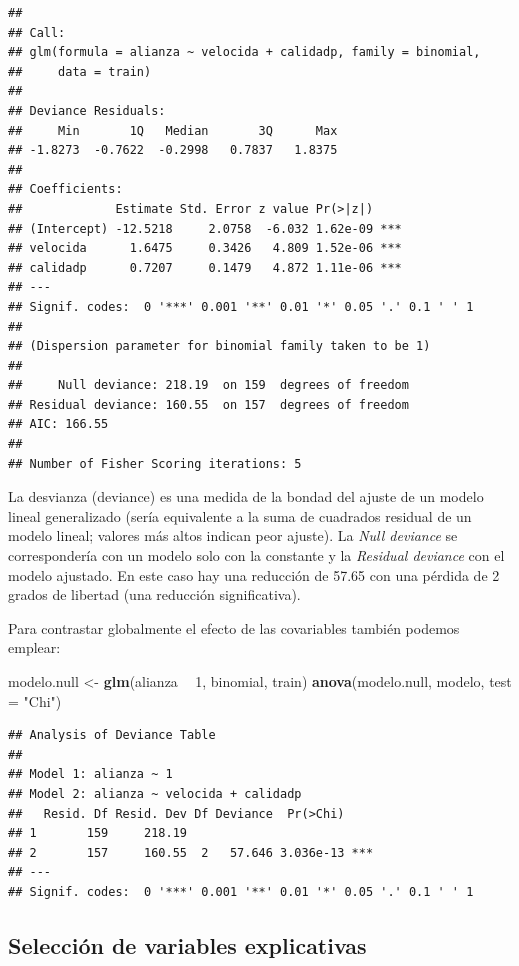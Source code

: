 \documentclass[
]{book}
\newenvironment{Shaded}{\begin{snugshade}}{\end{snugshade}}
\newcommand{\DataTypeTok}[1]{\textcolor[rgb]{0.13,0.29,0.53}{#1}}
\newcommand{\DecValTok}[1]{\textcolor[rgb]{0.00,0.00,0.81}{#1}}
\newcommand{\KeywordTok}[1]{\textcolor[rgb]{0.13,0.29,0.53}{\textbf{#1}}}
\newcommand{\NormalTok}[1]{#1}
\newcommand{\OperatorTok}[1]{\textcolor[rgb]{0.81,0.36,0.00}{\textbf{#1}}}
\newcommand{\StringTok}[1]{\textcolor[rgb]{0.31,0.60,0.02}{#1}}
\theoremstyle{break}
\theoremstyle{definition}
\theoremstyle{definition}
\theoremstyle{definition}
\theoremstyle{remark}
\begin{document}
\begin{verbatim}
## 
## Call:
## glm(formula = alianza ~ velocida + calidadp, family = binomial, 
##     data = train)
## 
## Deviance Residuals: 
##     Min       1Q   Median       3Q      Max  
## -1.8273  -0.7622  -0.2998   0.7837   1.8375  
## 
## Coefficients:
##             Estimate Std. Error z value Pr(>|z|)    
## (Intercept) -12.5218     2.0758  -6.032 1.62e-09 ***
## velocida      1.6475     0.3426   4.809 1.52e-06 ***
## calidadp      0.7207     0.1479   4.872 1.11e-06 ***
## ---
## Signif. codes:  0 '***' 0.001 '**' 0.01 '*' 0.05 '.' 0.1 ' ' 1
## 
## (Dispersion parameter for binomial family taken to be 1)
## 
##     Null deviance: 218.19  on 159  degrees of freedom
## Residual deviance: 160.55  on 157  degrees of freedom
## AIC: 166.55
## 
## Number of Fisher Scoring iterations: 5
\end{verbatim}

La desvianza (deviance) es una medida de la bondad del ajuste de un modelo lineal generalizado (sería equivalente a la suma de cuadrados residual de un modelo lineal; valores más altos indican peor ajuste).
La \emph{Null deviance} se correspondería con un modelo solo con la constante y la \emph{Residual deviance} con el modelo ajustado.
En este caso hay una reducción de 57.65 con una pérdida de 2 grados de libertad (una reducción significativa).

Para contrastar globalmente el efecto de las covariables también podemos emplear:

\begin{Shaded}
\begin{Highlighting}[]
\NormalTok{modelo.null <-}\StringTok{ }\KeywordTok{glm}\NormalTok{(alianza }\OperatorTok{~}\StringTok{ }\DecValTok{1}\NormalTok{, binomial, train)}
\KeywordTok{anova}\NormalTok{(modelo.null, modelo, }\DataTypeTok{test =} \StringTok{"Chi"}\NormalTok{)}
\end{Highlighting}
\end{Shaded}

\begin{verbatim}
## Analysis of Deviance Table
## 
## Model 1: alianza ~ 1
## Model 2: alianza ~ velocida + calidadp
##   Resid. Df Resid. Dev Df Deviance  Pr(>Chi)    
## 1       159     218.19                          
## 2       157     160.55  2   57.646 3.036e-13 ***
## ---
## Signif. codes:  0 '***' 0.001 '**' 0.01 '*' 0.05 '.' 0.1 ' ' 1
\end{verbatim}

\hypertarget{selecciuxf3n-de-variables-explicativas}{%
\subsection{Selección de variables explicativas}\label{selecciuxf3n-de-variables-explicativas}}
\end{document}
